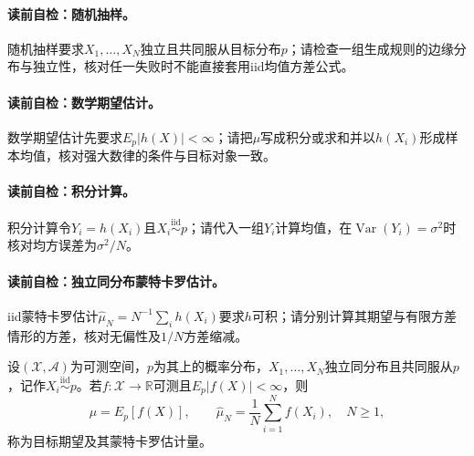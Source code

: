 \paragraph{读前自检：随机抽样。}随机抽样要求$X_1,\ldots,X_N$独立且共同服从目标分布$p$；请检查一组生成规则的边缘分布与独立性，核对任一失败时不能直接套用iid均值方差公式。\par
\paragraph{读前自检：数学期望估计。}数学期望估计先要求$E_p|h(X)|<\infty$；请把$\mu$写成积分或求和并以$h(X_i)$形成样本均值，核对强大数律的条件与目标对象一致。\par
\paragraph{读前自检：积分计算。}积分计算令$Y_i=h(X_i)$且$X_i\stackrel{\mathrm{iid}}{\sim}p$；请代入一组$Y_i$计算均值，在$\operatorname{Var}(Y_i)=\sigma^2$时核对均方误差为$\sigma^2/N$。\par

\label{struct:V5-C02-CH07}
\paragraph{读前自检：独立同分布蒙特卡罗估计。}iid蒙特卡罗估计$\widehat\mu_N=N^{-1}\sum_i h(X_i)$要求$h$可积；请分别计算其期望与有限方差情形的方差，核对无偏性及$1/N$方差缩减。\par

\begin{definition}[独立同分布蒙特卡罗估计]
设$(\mathcal X,\mathcal A)$为可测空间，$p$为其上的概率分布，$X_1,\ldots,X_N$独立同分布且共同服从$p$，记作$X_i\stackrel{\mathrm{iid}}{\sim}p$。若$f:\mathcal X\to\mathbb R$可测且$E_p|f(X)|<\infty$，则
\begin{equation}\label{eq:V5-C02-mc-estimator}
\mu=E_p[f(X)],\qquad
\widehat\mu_N=\frac1N\sum_{i=1}^N f(X_i),\quad N\ge1,
\end{equation}
称为目标期望及其蒙特卡罗估计量。
\end{definition}

